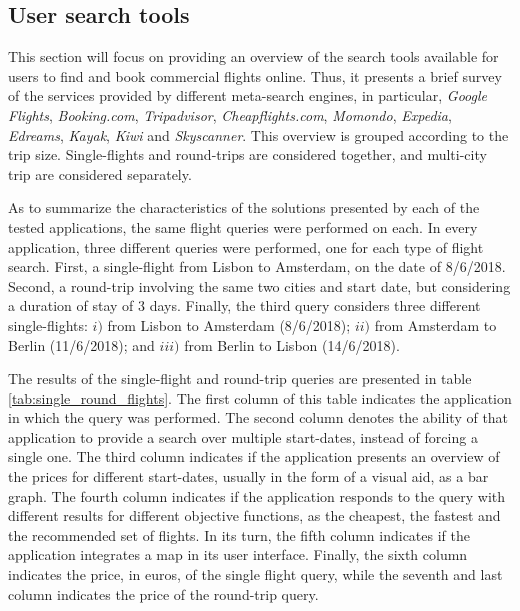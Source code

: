 \subsection{User search tools}
\label{sec:user_st}

This section will focus on providing an overview of the search tools available for users to find and book commercial flights online. Thus, it presents a brief survey of the services provided by different meta-search engines, in particular, \textit{Google Flights}, \textit{Booking.com}, \textit{Tripadvisor}, \textit{Cheapflights.com}, \textit{Momondo}, \textit{Expedia}, \textit{Edreams}, \textit{Kayak}, \textit{Kiwi} and \textit{Skyscanner}. This overview is grouped according to the trip size. Single-flights and round-trips are considered together, and multi-city trip are considered separately.

As to summarize the characteristics of the solutions presented by each of the tested applications, the same flight queries were performed on each. In every application, three different queries were performed, one for each type of flight search. First, a single-flight from Lisbon to Amsterdam, on the date of 8/6/2018. Second, a round-trip involving the same two cities and start date, but considering a duration of stay of 3 days. Finally, the third query considers three different single-flights: $i)$ from Lisbon to Amsterdam (8/6/2018); $ii)$ from Amsterdam to Berlin (11/6/2018); and $iii)$ from Berlin to Lisbon (14/6/2018).

The results of the single-flight and round-trip queries are presented in table \ref{tab:single_round_flights}. The first column of this table indicates the application in which the query was performed. The second column denotes the ability of that application to provide a search over multiple start-dates, instead of forcing a single one. The third column indicates if the application presents an overview of the prices for different start-dates, usually in the form of a visual aid, as a bar graph. The fourth column indicates if the application responds to the query with different results for different objective functions, as the cheapest, the fastest and the recommended set of flights. In its turn, the fifth column indicates if the application integrates a map in its user interface. Finally, the sixth column indicates the price, in euros, of the single flight query, while the seventh and last column indicates the price of the round-trip query.

